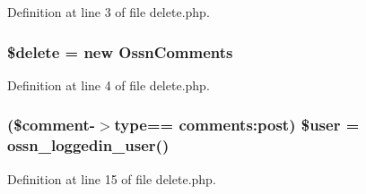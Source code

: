 Definition at line 3 of file delete.\+php.

\subsubsection[{\texorpdfstring{\$delete}{$delete}}]{\setlength{\rightskip}{0pt plus 5cm}\$delete = new {\bf Ossn\+Comments}}\hypertarget{components_2_ossn_comments_2actions_2comment_2delete_8php_aba2374a8b713514611e21494ec2fef8d}{}\label{components_2_ossn_comments_2actions_2comment_2delete_8php_aba2374a8b713514611e21494ec2fef8d}


Definition at line 4 of file delete.\+php.

\subsubsection[{\texorpdfstring{\$user}{$user}}]{ (\$comment-\/$>${\bf type}== \textquotesingle{}comments\+:post\textquotesingle{}) \${\bf user} = {\bf ossn\+\_\+loggedin\+\_\+user}()}\hypertarget{components_2_ossn_comments_2actions_2comment_2delete_8php_a7945a6803175e296f6af77f90b130253}{}\label{components_2_ossn_comments_2actions_2comment_2delete_8php_a7945a6803175e296f6af77f90b130253}


Definition at line 15 of file delete.\+php.

